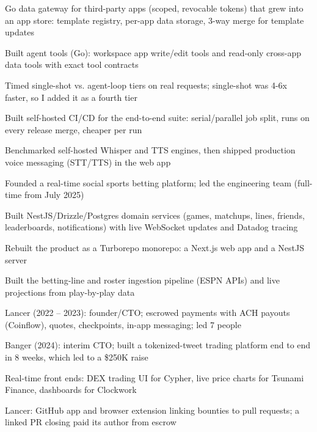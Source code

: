\documentclass[print]{jack-resume}
\begin{document}
\begin{tightemize}
    \item Go data gateway for third-party apps (scoped, revocable tokens) that grew into an app store: template registry, per-app data storage, 3-way merge for template updates
    \item Built agent tools (Go): workspace app write/edit tools and read-only cross-app data tools with exact tool contracts
    \item Timed single-shot vs. agent-loop tiers on real requests; single-shot was 4-6x faster, so I added it as a fourth tier
    \item Built self-hosted CI/CD for the end-to-end suite: serial/parallel job split, runs on every release merge, cheaper per run
    \item Benchmarked self-hosted Whisper and TTS engines, then shipped production voice messaging (STT/TTS) in the web app
\end{tightemize}
\sectionsep

\begin{tightemize}
    \item Founded a real-time social sports betting platform; led the engineering team (full-time from July 2025)
    \item Built NestJS/Drizzle/Postgres domain services (games, matchups, lines, friends, leaderboards, notifications) with live WebSocket updates and Datadog tracing
    \item Rebuilt the product as a Turborepo monorepo: a Next.js web app and a NestJS server
    \item Built the betting-line and roster ingestion pipeline (ESPN APIs) and live projections from play-by-play data
\end{tightemize}
\sectionsep

\begin{tightemize}
    \item Lancer (2022 -- 2023): founder/CTO; escrowed payments with ACH payouts (Coinflow), quotes, checkpoints, in-app messaging; led 7 people
    \item Banger (2024): interim CTO; built a tokenized-tweet trading platform end to end in 8 weeks, which led to a \$250K raise
    \item Real-time front ends: DEX trading UI for Cypher, live price charts for Tsunami Finance, dashboards for Clockwork
    \item Lancer: GitHub app and browser extension linking bounties to pull requests; a linked PR closing paid its author from escrow
\end{tightemize}
\sectionsep
\end{document}
